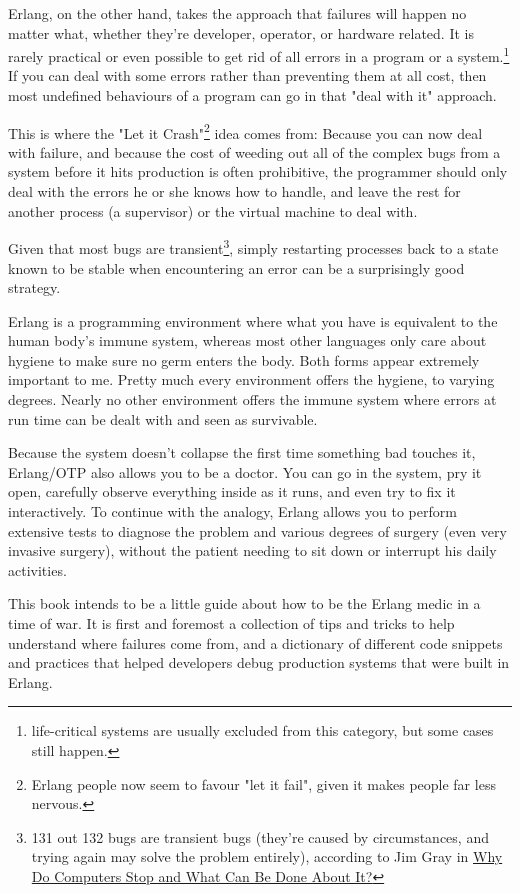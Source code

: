 \documentclass[11pt, oneside]{book}   	%
\begin{document}
Erlang, on the other hand, takes the approach that failures will happen no matter what, whether they're developer, operator, or hardware related. It is rarely practical or even possible to get rid of all errors in a program or a system.\footnote{life-critical systems are usually excluded from this category, but some cases still happen.} If you can deal with some errors rather than preventing them at all cost, then most undefined behaviours of a program can go in that "deal with it" approach.

This is where the "Let it Crash"\footnote{Erlang people now seem to favour "let it fail", given it makes people far less nervous.} idea comes from: Because you can now deal with failure, and because the cost of weeding out all of the complex bugs from a system before it hits production is often prohibitive, the programmer should only deal with the errors he or she knows how to handle, and leave the rest for another process (a supervisor) or the virtual machine to deal with.

Given that most bugs are transient\footnote{131 out 132 bugs are transient bugs (they're caused by circumstances, and trying again may solve the problem entirely), according to Jim Gray in \href{http://www.hpl.hp.com/techreports/tandem/TR-85.7.html}{Why Do Computers Stop and What Can Be Done About It?}}, simply restarting processes back to a state known to be stable when encountering an error can be a surprisingly good strategy.

Erlang is a programming environment where what you have is equivalent to the human body's immune system, whereas most other languages only care about hygiene to make sure no germ enters the body. Both forms appear extremely important to me. Pretty much every environment offers the hygiene, to varying degrees. Nearly no other environment offers the immune system where errors at run time can be dealt with and seen as survivable.

Because the system doesn't collapse the first time something bad touches it, Erlang/OTP also allows you to be a doctor. You can go in the system, pry it open, carefully observe everything inside as it runs, and even try to fix it interactively. To continue with the analogy, Erlang allows you to perform extensive tests to diagnose the problem and various degrees of surgery (even very invasive surgery), without the patient needing to sit down or interrupt his daily activities.

This book intends to be a little guide about how to be the Erlang medic in a time of war. It is first and foremost a collection of tips and tricks to help understand where failures come from, and a dictionary of different code snippets and practices that helped developers debug production systems that were built in Erlang.
\end{document}
